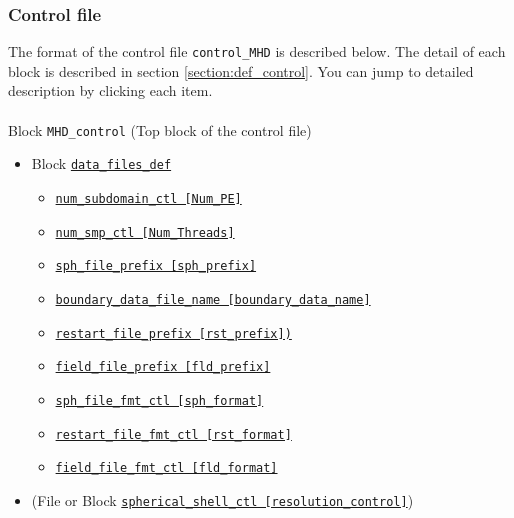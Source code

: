 \subsubsection{Control file}
The format of the control file \verb|control_MHD| is described below. The detail of each block is described in section \ref{section:def_control}. You can jump to detailed description by clicking each item. \\
\\
%
Block \verb|MHD_control|  (Top block of the control file)
\label{href_i:MHD_control}
%
\begin{itemize}
\item Block \hyperref[href_t:data_files_def]{\tt data\_files\_def}
	\label{href_i:data_files_def}
%
	\begin{itemize}
	\item \hyperref[href_t:num_subdomain_ctl]
			{\tt num\_subdomain\_ctl    [Num\_PE]}
	\item \hyperref[href_t:num_smp_ctl]
			{\tt num\_smp\_ctl    [Num\_Threads]}
	\item \hyperref[href_t:sph_file_prefix]
			{\tt sph\_file\_prefix    [sph\_prefix]}
	\item \hyperref[href_t:boundary_data_file_name]
		{\tt boundary\_data\_file\_name    [boundary\_data\_name]}
%
	\item \hyperref[href_t:restart_file_prefix]
		{\tt restart\_file\_prefix    [rst\_prefix])}
	\item \hyperref[href_t:field_file_prefix]
			{\tt field\_file\_prefix    [fld\_prefix]}
%
	\item \hyperref[href_t:sph_file_fmt_ctl]
			{\tt sph\_file\_fmt\_ctl    [sph\_format]}
	\item \hyperref[href_t:restart_file_fmt_ctl]
			{\tt restart\_file\_fmt\_ctl    [rst\_format]}
	\item \hyperref[href_t:field_file_fmt_ctl]
			{\tt field\_file\_fmt\_ctl    [fld\_format]}
	\end{itemize}
%
\item (File or Block \hyperref[href_i:spherical_shell_ctl]
			{\tt spherical\_shell\_ctl        [resolution\_control]})
\end{itemize}
